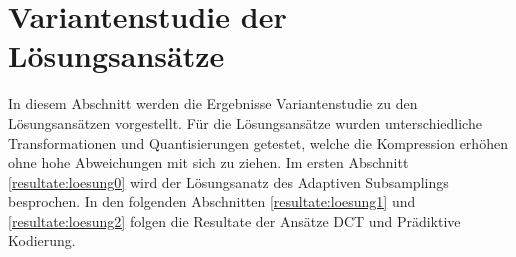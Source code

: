 \section{Variantenstudie der Lösungsansätze}\label{resultate}
In diesem Abschnitt werden die Ergebnisse Variantenstudie zu den Lösungsansätzen vorgestellt. Für die Lösungsansätze wurden unterschiedliche Transformationen und Quantisierungen getestet, welche die Kompression erhöhen ohne hohe Abweichungen mit sich zu ziehen. Im ersten Abschnitt \ref{resultate:loesung0} wird der Lösungsanatz des Adaptiven Subsamplings besprochen. In den folgenden Abschnitten \ref{resultate:loesung1} und \ref{resultate:loesung2} folgen die Resultate der Ansätze DCT und Prädiktive Kodierung.


\pagebreak

\pagebreak
